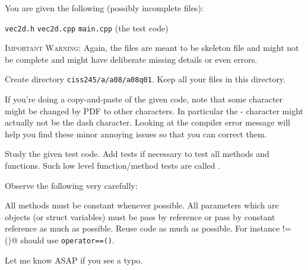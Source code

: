 You are given the following (possibly incomplete files):
\begin{tightlist}
  \li \texttt{vec2d.h}
  \li \texttt{vec2d.cpp}
  \li \texttt{main.cpp} (the test code)
\end{tightlist}
\textsc{Important Warning:}
Again, the files are meant to be skeleton file and might not be
complete and might have deliberate missing details or even errors.

Create directory
\texttt{ciss245/a/a08/a08q01}.
Keep all your files in this directory.

If you're doing a copy-and-paste of the given code,
note that some character might be changed by PDF to other characters.
In particular the - character might actually not be the dash character.
Looking at the compiler error message will help you find these minor
annoying issues so that you can correct them.

Study the given test code.
Add tests if necessary to test all methods and functions.
Such low level function/method tests are called .

Observe the following very carefully:
\begin{tightlist}
\li All methods must be constant whenever possible. 
\li All parameters which are objects (or struct variables)
must be pass by reference or pass by constant reference as much as possible.
\li Reuse code as much as possible.
For instance \verb@operator!=()@ should use \verb!operator==()!. 
\end{tightlist}

Let me know ASAP if you see a typo.

